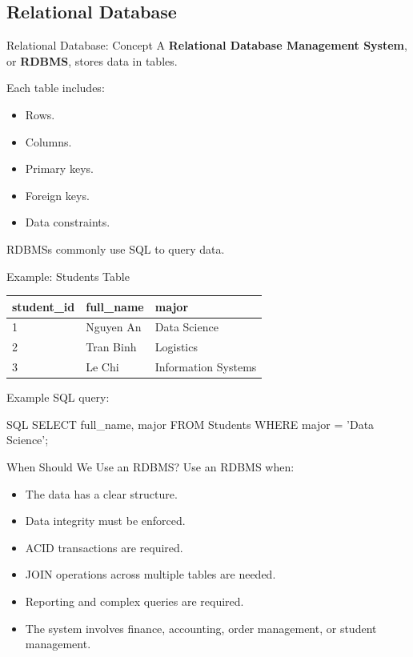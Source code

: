 \documentclass[aspectratio=169,11pt]{beamer}
\newcommand{\keyword}[1]{\textcolor{accent}{\textbf{#1}}}
\newcommand{\kw}[1]{\keyword{#1}}
\newcommand{\smallitem}{\setlength{\itemsep}{2pt}\setlength{\parskip}{0pt}}
\begin{document}
\subsection{Relational Database}

\begin{frame}{Relational Database: Concept}
A \kw{Relational Database Management System}, or \kw{RDBMS}, stores data in tables.

\vspace{2mm}
Each table includes:
\begin{itemize}
  \smallitem
  \item Rows.
  \item Columns.
  \item Primary keys.
  \item Foreign keys.
  \item Data constraints.
\end{itemize}

RDBMSs commonly use SQL to query data.
\end{frame}

\begin{frame}{Example: Students Table}
\scriptsize
\begin{center}
\begin{tabular}{lll}
\toprule
\textbf{student\_id} & \textbf{full\_name} & \textbf{major} \\
\midrule
1 & Nguyen An & Data Science \\
2 & Tran Binh & Logistics \\
3 & Le Chi & Information Systems \\
\bottomrule
\end{tabular}
\end{center}

\vspace{2mm}
Example SQL query:
\begin{block}{SQL}
\ttfamily SELECT full\_name, major FROM Students WHERE major = 'Data Science';
\end{block}
\end{frame}

\begin{frame}{When Should We Use an RDBMS?}
Use an RDBMS when:
\begin{itemize}
  \smallitem
  \item The data has a clear structure.
  \item Data integrity must be enforced.
  \item ACID transactions are required.
  \item JOIN operations across multiple tables are needed.
  \item Reporting and complex queries are required.
  \item The system involves finance, accounting, order management, or student management.
\end{itemize}
\end{frame}
\end{document}
